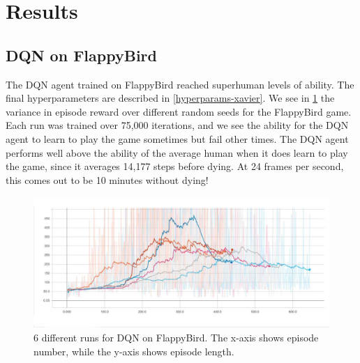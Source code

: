 \documentclass{article}
\begin{document}
\section{Results}

\subsection{DQN on FlappyBird}

The DQN agent trained on FlappyBird reached superhuman levels of ability. 
The final hyperparameters are described in \ref{hyperparams-xavier}.
We see in \ref{fig:flappy-training-eps} the variance in episode reward over different random seeds for the FlappyBird game.
Each run was trained over 75,000 iterations, and we see the ability for the DQN agent to learn to play the game sometimes but fail other times.
The DQN agent performs well above the ability of the average human when it does learn to play the game, since it averages 14,177 steps before dying.
At 24 frames per second, this comes out to be 10 minutes without dying!

\begin{figure}[h!]
\includegraphics[width=\textwidth]{flappy-training-eps}
\caption{6 different runs for DQN on FlappyBird. The x-axis shows episode number, while the y-axis shows episode length.}
\label{fig:flappy-training-eps}
\end{figure}
\end{document}
